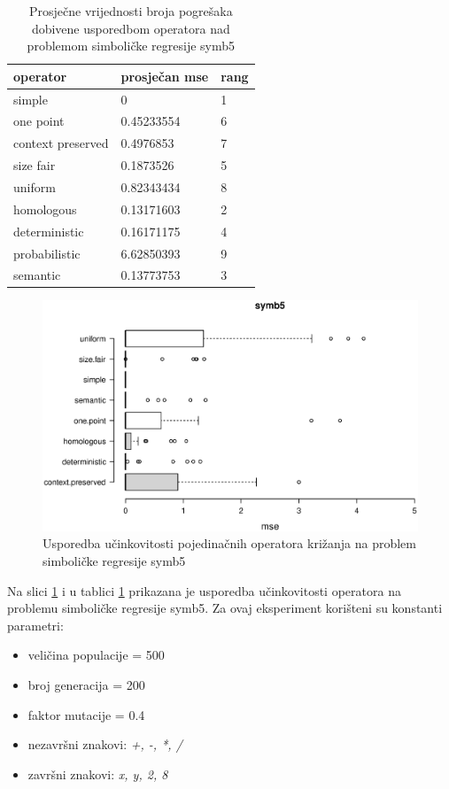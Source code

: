 \begin{table}[H]
 	\centering

    \begin{tabular}{| l | l | l |}
    \hline
    \textbf{operator} & \textbf{prosječan mse} & \textbf{rang}\\ \hline
    simple & 0 & 1\\ \hline
    one point & 0.45233554 & 6\\ \hline
    context preserved & 0.4976853 & 7\\ \hline
    size fair & 0.1873526 & 5\\ \hline
    uniform & 0.82343434 & 8\\ \hline
    homologous & 0.13171603 & 2\\ \hline
    deterministic & 0.16171175 & 4\\ \hline
    probabilistic & 6.62850393 & 9\\ \hline
    semantic & 0.13773753 & 3\\ \hline
    \end{tabular}
    
    \caption{Prosječne vrijednosti broja pogrešaka dobivene usporedbom operatora nad problemom simboličke regresije symb5}
    \label{symb5table}
\end{table}

\begin{figure}[H]
	\centering
	\includegraphics[trim=0cm 4cm 0cm 0cm, scale=0.6]{./slike/boxPlots/symb5.eps}
	\caption{Usporedba učinkovitosti pojedinačnih operatora križanja na problem simboličke regresije symb5}
	\label{symb5box}
\end{figure}


Na slici \ref{symb5box} i u tablici \ref{symb5table} prikazana je usporedba učinkovitosti operatora na problemu simboličke regresije symb5. Za ovaj eksperiment korišteni su konstanti parametri:
\begin{itemize}
\item{veličina populacije = 500}
\item{broj generacija = 200}
\item{faktor mutacije = 0.4}
\item{nezavršni znakovi: \textit{+, -, *, /}}
\item{završni znakovi: \textit{x, y, 2, 8}}
\end{itemize} 

